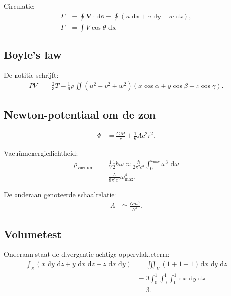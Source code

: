\documentclass[11pt]{article}
\newcommand{\dd}{\,\mathrm{d}}
\newcommand{\vect}[1]{\mathbf{#1}}
\begin{document}
Circulatie:
\begin{align*}
\Gamma
&=
\oint \vect{V}\cdot\dd\vect{s}
=
\oint\left(
u\,\dd x+v\,\dd y+w\,\dd z
\right),
\\
\Gamma
&=
\int V\cos\theta\,\dd s.
\end{align*}

\subsection*{Boyle's law}

De notitie schrijft:
\begin{align*}
PV
&=
\frac{2}{3}T
-
\frac{1}{6}\rho
\iint
\left(
u^2+v^2+w^2
\right)
\left(
x\cos\alpha+y\cos\beta+z\cos\gamma
\right).
\end{align*}

\subsection*{Newton-potentiaal om de zon}

\begin{align*}
\Phi
&=
\frac{GM}{r}
+
\frac{1}{6}\Lambda c^2r^2.
\end{align*}

Vacuümenergiedichtheid:
\begin{align*}
\rho_{\mathrm{vacuum}}
&=
\frac{1}{V}\frac{1}{2}\hbar\omega
\approx
\frac{\hbar}{2\pi^2c^3}
\int_{0}^{\omega_{\max}}
\omega^3\,\dd\omega
\\
&=
\frac{\hbar}{8\pi^2c^3}
\omega_{\max}^{4}.
\end{align*}

De onderaan genoteerde schaalrelatie:
\begin{align*}
\Lambda
  &\simeq
  \frac{Gm^6}{\hbar^4}.
\end{align*}

\subsection*{Volumetest}

Onderaan staat de divergentie-achtige oppervlakteterm:
\begin{align*}
\int_S
\left(
x\,\dd y\,\dd z
+
y\,\dd x\,\dd z
+
z\,\dd x\,\dd y
\right)
&=
\iiint_V
\left(1+1+1\right)
\dd x\,\dd y\,\dd z
\\
&=
3\int_{0}^{1}\int_{0}^{1}\int_{0}^{1}
\dd x\,\dd y\,\dd z
\\
&=
3.
\end{align*}
\end{document}
